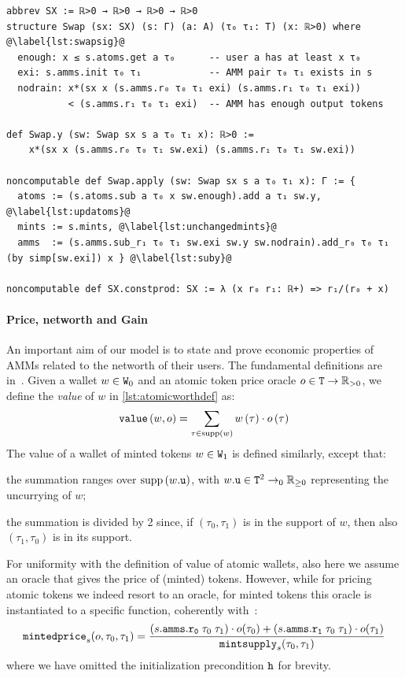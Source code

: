 \begin{table}[t]
\caption{Definition of the swap transaction type and of its application, as well as the constant-product swap rate function.}
\label{list:swapdefs}
\begin{lstlisting}
abbrev SX := ℝ>0 → ℝ>0 → ℝ>0 → ℝ>0
structure Swap (sx: SX) (s: Γ) (a: A) (τ₀ τ₁: T) (x: ℝ>0) where @\label{lst:swapsig}@
  enough: x ≤ s.atoms.get a τ₀      -- user a has at least x τ₀
  exi: s.amms.init τ₀ τ₁            -- AMM pair τ₀ τ₁ exists in s
  nodrain: x*(sx x (s.amms.r₀ τ₀ τ₁ exi) (s.amms.r₁ τ₀ τ₁ exi))
           < (s.amms.r₁ τ₀ τ₁ exi)  -- AMM has enough output tokens

def Swap.y (sw: Swap sx s a τ₀ τ₁ x): ℝ>0 := 
    x*(sx x (s.amms.r₀ τ₀ τ₁ sw.exi) (s.amms.r₁ τ₀ τ₁ sw.exi))

noncomputable def Swap.apply (sw: Swap sx s a τ₀ τ₁ x): Γ := {
  atoms := (s.atoms.sub a τ₀ x sw.enough).add a τ₁ sw.y, @\label{lst:updatoms}@
  mints := s.mints, @\label{lst:unchangedmints}@
  amms  := (s.amms.sub_r₁ τ₀ τ₁ sw.exi sw.y sw.nodrain).add_r₀ τ₀ τ₁ (by simp[sw.exi]) x } @\label{lst:suby}@

noncomputable def SX.constprod: SX := λ (x r₀ r₁: ℝ+) => r₁/(r₀ + x)
\end{lstlisting}
\end{table}

\paragraph*{Price, networth and Gain}

An important aim of our model is to state and prove economic properties of AMMs related to the networth of their users. The fundamental definitions are in~. Given a wallet $w \in \code W_0$ and an atomic token price oracle $o \in \code T \to \mathbb R_{>0}$, we define the \emph{value} of $w$ in \cref{lst:atomicworthdef} as:
\[
\code{value}\left(w, o\right) = \sum\limits_{\tau \in \mathrm{supp}\left(w\right)} w\left(\tau\right) \cdot o\left(\tau\right)
\] 
The value of a wallet of minted tokens $w \in \code W_1$
is defined similarly, except that: 
\begin{inlinelist}
\item the summation ranges over $\mathrm{supp}\left(w\code{.u}\right)$, with $w\code{.u} \in \code T^2 \to_0 \mathbb R_{\geq 0}$ representing the uncurrying of $w$;
\item the summation is divided by 2 since, if $\left(\tau_0, \tau_1\right)$ is in the support of $w$, then also $\left(\tau_1, \tau_0\right)$ is in its support.
\end{inlinelist}
For uniformity with the definition of value of atomic wallets, 
also here we assume an oracle that gives the price of (minted) tokens. 
However, while for pricing atomic tokens we indeed resort to an oracle,
for minted tokens this oracle is instantiated to a specific function,
coherently with~\cite{Bartoletti_2022}: 
\[
\code{mintedprice}_s(o, \tau_0, \tau_1) = \frac
    {(s.\code{amms.r_0} \; \tau_0 \; \tau_1) \cdot o(\tau_0) + (s.\code{amms.r_1} \; \tau_0 \; \tau_1) \cdot o(\tau_1)}
    {\code{mintsupply}_s(\tau_0,\tau_1)}
\]
where we have omitted the initialization precondition $\code{h}$ for brevity.

